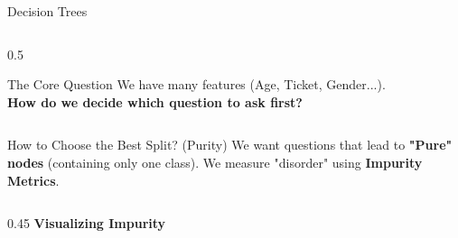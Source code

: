 \begin{frame}{Decision Trees}
\begin{columns}[c]
\begin{column}{0.5\textwidth}
            \pause
            \vspace{1em}
            \begin{alertblock}{\centering The Core Question}
                \centering
                We have many features (Age, Ticket, Gender...). \\
                \textbf{How do we decide which question to ask first?}
            \end{alertblock}
        \end{column}
    \end{columns}
\end{frame}

\begin{frame}{How to Choose the Best Split? (Purity)}
    We want questions that lead to \textbf{"Pure" nodes} (containing only one class).
    We measure "disorder" using \textbf{Impurity Metrics}.

    \vspace{0.5em}
    \begin{columns}[T]
        \begin{column}{0.45\textwidth}
            \centering
            \textbf{Visualizing Impurity}
            \vspace{0.5em}
            


\end{column}
\end{columns}
\end{frame}
